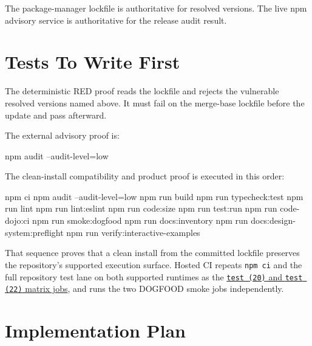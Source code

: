 The package-manager lockfile is authoritative for resolved versions. The live npm advisory service is authoritative for the release audit result.

\section{Tests To Write First}\label{record-248-tests-to-write-first}

The deterministic RED proof reads the lockfile and rejects the vulnerable resolved versions named above. It must fail on the merge-base lockfile before the update and pass afterward.

The external advisory proof is:

\begin{CodeBlock}
npm audit --audit-level=low
\end{CodeBlock}

The clean-install compatibility and product proof is executed in this order:

\begin{CodeBlock}
npm ci
npm audit --audit-level=low
npm run build
npm run typecheck:test
npm run lint
npm run lint:eslint
npm run code:size
npm run test:run
npm run code-dojo:ci
npm run smoke:dogfood
npm run docs:inventory
npm run docs:design-system:preflight
npm run verify:interactive-examples
\end{CodeBlock}

That sequence proves that a clean install from the committed lockfile preserves the repository's supported execution surface. Hosted CI repeats \texttt{n\allowbreak{}p\allowbreak{}m\allowbreak{} \allowbreak{}c\allowbreak{}i} and the full repository test lane on both supported runtimes as the \href{https://github.com/flyingrobots/bijou/blob/cbd70612140e7a450d764b3c7be1c6af878b99bc/.github/workflows/ci.yml}{\texttt{t\allowbreak{}e\allowbreak{}s\allowbreak{}t\allowbreak{} \allowbreak{}(\allowbreak{}2\allowbreak{}0\allowbreak{})} and \texttt{t\allowbreak{}e\allowbreak{}s\allowbreak{}t\allowbreak{} \allowbreak{}(\allowbreak{}2\allowbreak{}2\allowbreak{})} matrix jobs}, and runs the two DOGFOOD smoke jobs independently.

\section{Implementation Plan}\label{record-248-implementation-plan}

